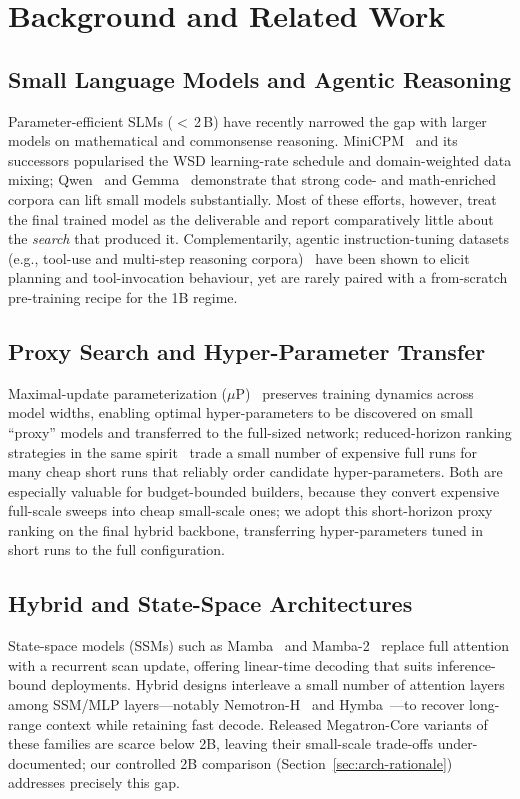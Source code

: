 \section{Background and Related Work}

\subsection{Small Language Models and Agentic Reasoning}
Parameter-efficient SLMs ($<\,$2\,B) have recently narrowed the gap with larger models on mathematical and commonsense reasoning.
MiniCPM~\cite{minicpm2024} and its successors popularised the WSD learning-rate schedule and domain-weighted data mixing; Qwen~\cite{yang2025qwen3} and Gemma~\cite{gemmateam2025gemma3} demonstrate that strong code- and math-enriched corpora can lift small models substantially.
Most of these efforts, however, treat the final trained model as the deliverable and report comparatively little about the \emph{search} that produced it.
Complementarily, agentic instruction-tuning datasets (e.g., tool-use and multi-step reasoning corpora)~\cite{liu2024agentbench} have been shown to elicit planning and tool-invocation behaviour, yet are rarely paired with a from-scratch pre-training recipe for the 1B regime.

\subsection{Proxy Search and Hyper-Parameter Transfer}
Maximal-update parameterization ($\mu$P)~\cite{yang2022tensor,yang2023tensor} preserves training dynamics across model widths, enabling optimal hyper-parameters to be discovered on small ``proxy'' models and transferred to the full-sized network; reduced-horizon ranking strategies in the same spirit~\cite{minicpm2024} trade a small number of expensive full runs for many cheap short runs that reliably order candidate hyper-parameters.
Both are especially valuable for budget-bounded builders, because they convert expensive full-scale sweeps into cheap small-scale ones; we adopt this short-horizon proxy ranking on the final hybrid backbone, transferring hyper-parameters tuned in short runs to the full configuration.

\subsection{Hybrid and State-Space Architectures}
State-space models (SSMs) such as Mamba~\cite{gu2023mamba} and Mamba-2~\cite{dao2024transformers} replace full attention with a recurrent scan update, offering linear-time decoding that suits inference-bound deployments.
Hybrid designs interleave a small number of attention layers among SSM/MLP layers---notably Nemotron-H~\cite{nvidia2025nemotronh} and Hymba~\cite{dong2024hymba}---to recover long-range context while retaining fast decode.
Released Megatron-Core variants of these families are scarce below 2B, leaving their small-scale trade-offs under-documented; our controlled 2B comparison (Section~\ref{sec:arch-rationale}) addresses precisely this gap.

